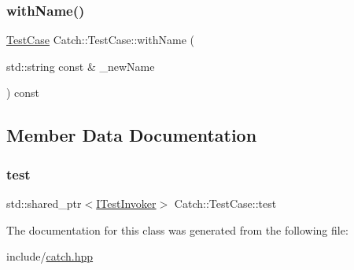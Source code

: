 \subsubsection{\texorpdfstring{withName()}{withName()}}
{\footnotesize\ttfamily \mbox{\hyperlink{class_catch_1_1_test_case}{Test\+Case}} Catch\+::\+Test\+Case\+::with\+Name (\begin{DoxyParamCaption}\item[{std\+::string const \&}]{\+\_\+new\+Name }\end{DoxyParamCaption}) const}



\subsection{Member Data Documentation}
\mbox{\label{class_catch_1_1_test_case_a7aaa375d6f2bda735095eaa43395b54b}} 
\subsubsection{\texorpdfstring{test}{test}}
{\footnotesize\ttfamily std\+::shared\+\_\+ptr$<$\mbox{\hyperlink{struct_catch_1_1_i_test_invoker}{I\+Test\+Invoker}}$>$ Catch\+::\+Test\+Case\+::test\hspace{0.3cm}{\ttfamily [private]}}



The documentation for this class was generated from the following file\+:\begin{DoxyCompactItemize}
\item 
include/\mbox{\hyperlink{catch_8hpp}{catch.\+hpp}}\end{DoxyCompactItemize}
